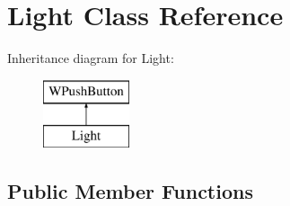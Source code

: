 \hypertarget{class_light}{}\section{Light Class Reference}
\label{class_light}
Inheritance diagram for Light\+:\begin{figure}[H]
\begin{center}
\leavevmode
\includegraphics[height=2.000000cm]{class_light}
\end{center}
\end{figure}
\subsection*{Public Member Functions}

